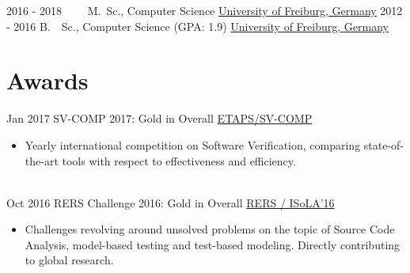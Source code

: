 \documentclass[letterpaper]{twentysecondcv} %
\begin{document}
\begin{twenty} %
	\twentyitem
    	{2016 - 2018~~~~}
        {}
        {M.~Sc., Computer Science}
        {\href{https://www.uni-freiburg.de/}{University of Freiburg, Germany}}
        {}
        {}
	\twentyitem
    	{2012 - 2016}
		{}
        {B.~~Sc., Computer Science \textnormal{(GPA: 1.9)}}
        {\href{https://www.uni-freiburg.de/}{University of Freiburg, Germany}}
        {}
        {}
\end{twenty}


\section{Awards}
\begin{twenty} %
	\twentyitem
    		{Jan 2017}
		{}
        		{SV-COMP 2017: Gold in Overall}
        		{\href{https://sv-comp.sosy-lab.org/2017/}{ETAPS/SV-COMP}}
        		{}
        		{\begin{itemize}
        			\item Yearly international competition on Software Verification, comparing state-of-the-art tools
        				with respect to effectiveness and efficiency.
        		\end{itemize}}\\
        	\twentyitem
    		{Oct 2016}
		{}
        		{RERS Challenge 2016: Gold in Overall}
        		{\href{http://rers-challenge.org/2016/}{RERS / ISoLA'16}}
        		{}
        		{\begin{itemize}
        			\item Challenges revolving around unsolved problems on the topic of Source Code Analysis,
        				model-based testing and test-based modeling. Directly contributing to global research.
        		\end{itemize}}
\end{twenty}

\vspace{6mm}

\end{document}
